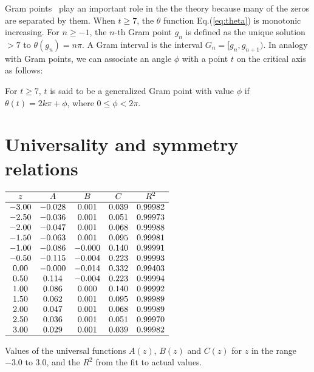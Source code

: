 \documentclass[twoside]{article}
\begin{document}
Gram points~\cite{Gram 1903} play an important role in the the theory because many of the zeros are separated by them.  When $t \ge 7$, the $\theta$ function Eq.(\ref{eq:theta}) is monotonic increasing. 
For $n \ge -1$, the $n$-th Gram point $g_n$ is defined as the unique solution $> 7$ to
$\theta (g_n) = n\pi$. A Gram interval is the interval $G_n = [g_n,g_{n+1})$.
 In analogy with Gram points, we can associate an angle $\phi$ with a point $t$ on the critical axis as follows:
\begin{definition}\label{phi}
For $t \ge 7$, $t$ is said to be a generalized Gram point with value $\phi$  if
$\theta (t) = 2k\pi + \phi$, where $0 \le \phi < 2\pi$.
\end{definition}



\section{\label{sec3}Universality and symmetry relations}

\begin{table}
\centering \(\begin{array}{ccccccc}
\hline
     z     & A   &      B      &   C    &R^2\\
\hline
-3.00& -0.028&  0.001&  0.039& 0.99982\\
  -2.50& -0.036&  0.001&  0.051& 0.99973\\
  -2.00& -0.047&  0.001&  0.068& 0.99988\\
  -1.50& -0.063&  0.001&  0.095& 0.99981\\
  -1.00& -0.086& -0.000&  0.140& 0.99991\\
  -0.50& -0.115& -0.004&  0.223& 0.99993\\
   0.00& -0.000& -0.014&  0.332& 0.99403\\
   0.50&  0.114& -0.004&  0.223& 0.99994\\
   1.00&  0.086&  0.000&  0.140& 0.99992\\
   1.50&  0.062&  0.001&  0.095& 0.99989\\
   2.00&  0.047&  0.001&  0.068& 0.99989\\
   2.50&  0.036&  0.001&  0.051& 0.99970\\
   3.00&  0.029&  0.001&  0.039& 0.99982\\
\hline
\end{array}\)
\caption{Values of the universal functions $A(z)$, $B(z)$ and $C(z)$ 
for $z$ in the range $-3.0$ to $3.0$, and the $R^2$ from the fit to actual values.} 
\label{tab:coefficients}
\end{table}
\end{document}

